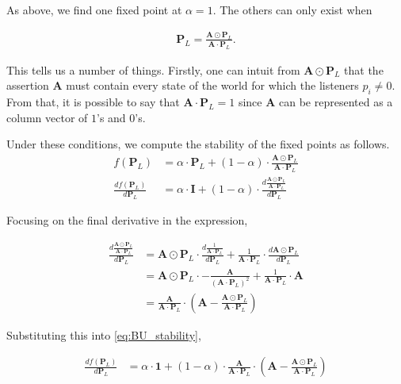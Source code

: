 As above, we find one fixed point at $\alpha = 1$. The others can only exist when

\begin{align*}
    \mathbf{P}_L = \frac{\mathbf{A} \odot \mathbf{P}_L}{\mathbf{A} \cdot \mathbf{P}_L}.
\end{align*}

This tells us a number of things. Firstly, one can intuit from $\mathbf{A} \odot \mathbf{P}_L$ that the assertion $\mathbf{A}$ must contain every state of the world for which the listeners $p_i \neq 0$. From that, it is possible to say that $\mathbf{A} \cdot \mathbf{P}_L = 1$ since $\mathbf{A}$ can be represented as a column vector of $1$'s and $0$'s. 

Under these conditions, we compute the stability of the fixed points as follows. 
\begin{align}
    f(\mathbf{P}_L) &= \alpha \cdot \mathbf{P}_L + (1 - \alpha) \cdot \frac{\mathbf{A} \odot \mathbf{P}_L}{\mathbf{A} \cdot \mathbf{P}_L}\\
    \frac{d f(\mathbf{P}_L)}{d \mathbf{P}_L} &= \alpha \cdot \mathbf{I} + (1 - \alpha) \cdot \frac{d \frac{\mathbf{A} \odot \mathbf{P}_L}{\mathbf{A} \cdot \mathbf{P}_L}}{d \mathbf{P}_L}\label{eq:BU_stability}
\end{align}

Focusing on the final derivative in the expression, 

\begin{align*}
    \frac{d \frac{\mathbf{A} \odot \mathbf{P}_L}{\mathbf{A} \cdot \mathbf{P}_L}}{d \mathbf{P}_L} &= \mathbf{A} \odot \mathbf{P}_L \cdot \frac{d \frac{1}{\mathbf{A} \cdot \mathbf{P}_L}}{d \mathbf{P}_L} + \frac{1}{\mathbf{A} \cdot \mathbf{P}_L} \cdot \frac{d \mathbf{A} \odot \mathbf{P}_L}{d \mathbf{P}_L}  \\
    &= \mathbf{A} \odot \mathbf{P}_L \cdot - \frac{\mathbf{A}}{(\mathbf{A} \cdot \mathbf{P}_L)^2} + \frac{1}{\mathbf{A} \cdot \mathbf{P}_L} \cdot \mathbf{A} \\
    &= \frac{\mathbf{A}}{\mathbf{A} \cdot \mathbf{P}_L} \cdot \left(  \mathbf{A} - \frac{\mathbf{A} \odot \mathbf{P}_L}{\mathbf{A} \cdot \mathbf{P}_L}  \right)
\end{align*}



Substituting this into \cref{eq:BU_stability},

\begin{align*}
    \frac{d f(\mathbf{P}_L)}{d \mathbf{P}_L} &= \alpha \cdot \mathbf{1} + (1 - \alpha) \cdot  \frac{\mathbf{A}}{\mathbf{A} \cdot \mathbf{P}_L} \cdot \left(  \mathbf{A} - \frac{\mathbf{A} \odot \mathbf{P}_L}{\mathbf{A} \cdot \mathbf{P}_L}  \right) \\
\end{align*}

